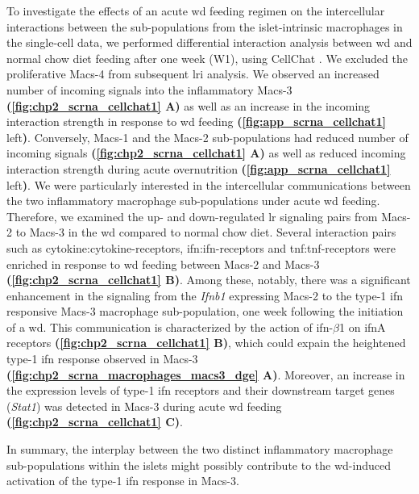 To investigate the effects of an acute \gls{wd} feeding regimen on the intercellular interactions between the sub-populations from the islet-intrinsic macrophages in the single-cell data, we performed differential interaction analysis between \gls{wd} and normal chow diet feeding after one week (W1), using CellChat \textbf{\cite{jin_cellchat_2023}}. We excluded the proliferative Macs-4 from subsequent \gls{lri} analysis. We observed an increased number of incoming signals into the inflammatory Macs-3 \textbf{(\autoref{fig:chp2_scrna_cellchat1} A)} as well as an increase in the incoming interaction strength in response to \gls{wd} feeding \textbf{(\autoref{fig:app_scrna_cellchat1}} left\textbf{)}. Conversely, Macs-1 and the Macs-2 sub-populations had reduced number of incoming signals \textbf{(\autoref{fig:chp2_scrna_cellchat1} A)} as well as reduced incoming interaction strength during acute overnutrition \textbf{(\autoref{fig:app_scrna_cellchat1}} left\textbf{)}. We were particularly interested in the intercellular communications between the two inflammatory macrophage sub-populations under acute \gls{wd} feeding. Therefore, we examined the up- and down-regulated \gls{lr} signaling pairs from Macs-2 to Macs-3 in the \gls{wd} compared to normal chow diet. Several interaction pairs such as cytokine:cytokine-receptors, \gls{ifn}:\gls{ifn}-receptors and \gls{tnf}:\gls{tnf}-receptors were enriched in response to \gls{wd} feeding between Macs-2 and Macs-3 \textbf{(\autoref{fig:chp2_scrna_cellchat1} B)}. Among these, notably, there was a significant enhancement in the signaling from the \textit{Ifnb1} expressing Macs-2 to the type-1 \gls{ifn} responsive Macs-3 macrophage sub-population, one week following the initiation of a \gls{wd}. This communication is characterized by the action of \gls{ifn}-$\beta$1 on \gls{ifn}A receptors \textbf{(\autoref{fig:chp2_scrna_cellchat1} B)}, which could expain the heightened type-1 \gls{ifn} response observed in Macs-3 \textbf{(\autoref{fig:chp2_scrna_macrophages_macs3_dge} A)}. Moreover, an increase in the expression levels of type-1 \gls{ifn} receptors and their downstream target genes (\textit{Stat1}) was detected in Macs-3 during acute \gls{wd} feeding \textbf{(\autoref{fig:chp2_scrna_cellchat1} C)}.\\

\par In summary, the interplay between the two distinct inflammatory macrophage sub-populations within the islets might possibly contribute to the \gls{wd}-induced activation of the type-1 \gls{ifn} response in Macs-3. 

